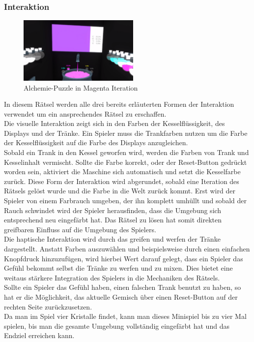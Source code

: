 \subsubsection{Interaktion}
\begin{figure}
	\vspace*{-0.5cm}
	\includegraphics[width=5.9cm]{Pictures/Alchemie_Magenta}
	\caption{Alchemie-Puzzle in Magenta Iteration}
	\vspace*{-0.5cm}
	\label{fig:alchemie_magenta}
\end{figure}
In diesem Rätsel werden alle drei bereits erläuterten Formen der Interaktion verwendet um ein ansprechendes Rätsel zu erschaffen.\\
Die visuelle Interaktion zeigt sich in den Farben der Kesselflüssigkeit, des Displays und der Tränke. Ein Spieler muss die Trankfarben nutzen um die Farbe der Kesselflüssigkeit auf die Farbe des Displays anzugleichen.\\
Sobald ein Trank in den Kessel geworfen wird, werden die Farben von Trank und Kesselinhalt vermischt. Sollte die Farbe korrekt, oder der \dq Reset\dq-Button gedrückt worden sein, aktiviert die Maschine sich automatisch und setzt die Kesselfarbe zurück. Diese Form der Interaktion wird abgerundet, sobald eine Iteration des Rätsels gelöst wurde und die Farbe in die Welt zurück kommt. Erst wird der Spieler von einem Farbrauch umgeben, der ihn komplett umhüllt und sobald der Rauch schwindet wird der Spieler herausfinden, dass die Umgebung sich entsprechend neu eingefärbt hat. Das Rätsel zu lösen hat somit direkten greifbaren Einfluss auf die Umgebung des Spielers.\\ \newpage
\noindent Die haptische Interaktion wird durch das greifen und werfen der Tränke dargestellt. Anstatt Farben auszuwählen und beispielsweise durch einen einfachen Knopfdruck hinzuzufügen, wird hierbei Wert darauf gelegt, dass ein Spieler das Gefühl bekommt selbst die Tränke zu werfen und zu mixen. Dies bietet eine weitaus stärkere Integration des Spielers in die Mechaniken des Rätsels.\\
Sollte ein Spieler das Gefühl haben, einen falschen Trank benutzt zu haben, so hat er die Möglichkeit, das aktuelle Gemisch über einen Reset-Button auf der rechten Seite zurückzusetzen.\\
Da man im Spiel vier Kristalle findet, kann man dieses Minispiel bis zu vier Mal spielen, bis man die gesamte Umgebung vollständig eingefärbt hat und das Endziel erreichen kann.

